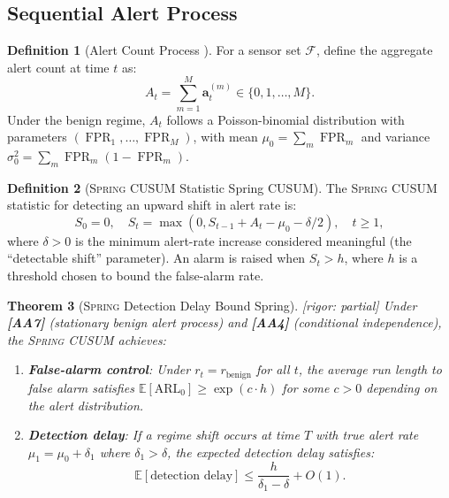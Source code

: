 \documentclass[11pt,a4paper]{article}
\newtheorem{theorem}{Theorem}[section]
\theoremstyle{definition}
\newtheorem{definition}[theorem]{Definition}
\theoremstyle{remark}
\newcommand{\rigorPartial}{\textcolor{orange!80!black}{[rigor: partial]}}
\newcommand{\assumptionTag}[1]{\textsf{\textbf{[A#1]}}}
\newcommand{\Spring}{\textsc{Spring}}
\DeclareMathOperator{\FPR}{FPR}
\newcommand{\E}{\mathbb{E}}
\newcommand{\cF}{\mathcal{F}}
\newcommand{\alertvec}{\mathbf{a}}
\begin{document}
\subsection{Sequential Alert Process }

\begin{definition}[Alert Count Process ]
\label{def:alert_process}
For a sensor set $\cF$, define the aggregate alert count at time $t$ as:
\begin{equation}
A_t = \sum_{m=1}^{M} \alertvec_t^{(m)} \in \{0, 1, \ldots, M\}.
\label{eq:alert_count}
\end{equation}
Under the benign regime, $A_t$ follows a Poisson-binomial distribution with parameters $(\FPR_1, \ldots, \FPR_M)$, with mean $\mu_0 = \sum_m \FPR_m$ and variance $\sigma_0^2 = \sum_m \FPR_m (1 - \FPR_m)$.
\end{definition}

\begin{definition}[\Spring{} CUSUM Statistic Spring CUSUM]
\label{def:spring_cusum}
The \Spring{} CUSUM statistic for detecting an upward shift in alert rate is:
\begin{equation}
S_0 = 0, \quad S_t = \max(0, S_{t-1} + A_t - \mu_0 - \delta/2), \quad t \geq 1,
\label{eq:spring_cusum}
\end{equation}
where $\delta > 0$ is the minimum alert-rate increase considered meaningful (the ``detectable shift'' parameter). An alarm is raised when $S_t > h$, where $h$ is a threshold chosen to bound the false-alarm rate.
\end{definition}

\begin{theorem}[\Spring{} Detection Delay Bound Spring]
\label{thm:spring_delay}
\rigorPartial
Under \assumptionTag{A7} (stationary benign alert process) and \assumptionTag{A4} (conditional independence), the \Spring{} CUSUM achieves:
\begin{enumerate}[label=(\roman*)]
    \item \textbf{False-alarm control}: Under $r_t = r_{\mathrm{benign}}$ for all $t$, the average run length to false alarm satisfies $\E[\mathrm{ARL}_0] \geq \exp(c \cdot h)$ for some $c > 0$ depending on the alert distribution.
    \item \textbf{Detection delay}: If a regime shift occurs at time $T$ with true alert rate $\mu_1 = \mu_0 + \delta_1$ where $\delta_1 > \delta$, the expected detection delay satisfies:
    \begin{equation}
    \E[\text{detection delay}] \leq \frac{h}{\delta_1 - \delta} + O(1).
    \label{eq:spring_delay}
    \end{equation}
\end{enumerate}
\end{theorem}
\end{document}
